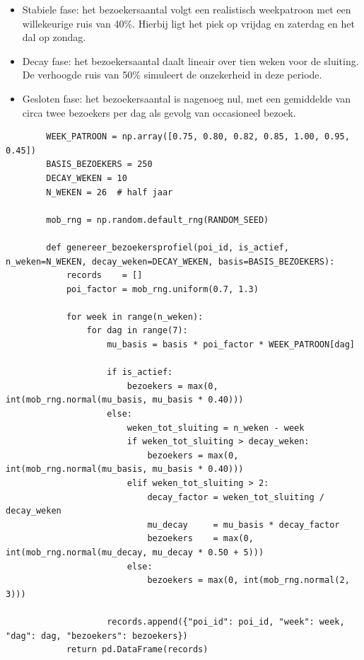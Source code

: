 \begin{itemize}
    \item Stabiele fase: het bezoekersaantal volgt een realistisch weekpatroon met een willekeurige ruis van 40\%. Hierbij ligt het piek op vrijdag en zaterdag en het dal op zondag.
    \item Decay fase: het bezoekersaantal daalt lineair over tien weken voor de sluiting. De verhoogde ruis van 50\% simuleert de onzekerheid in deze periode.
    \item Gesloten fase: het bezoekersaantal is nagenoeg nul, met een gemiddelde van circa twee bezoekers per dag als gevolg van occasioneel bezoek.
\end{itemize}

\begin{listing}[H]
    \begin{verbatim}
        WEEK_PATROON = np.array([0.75, 0.80, 0.82, 0.85, 1.00, 0.95, 0.45])
        BASIS_BEZOEKERS = 250
        DECAY_WEKEN = 10
        N_WEKEN = 26  # half jaar
        
        mob_rng = np.random.default_rng(RANDOM_SEED)
        
        def genereer_bezoekersprofiel(poi_id, is_actief, n_weken=N_WEKEN, decay_weken=DECAY_WEKEN, basis=BASIS_BEZOEKERS):
            records    = []
            poi_factor = mob_rng.uniform(0.7, 1.3)
            
            for week in range(n_weken):
                for dag in range(7):
                    mu_basis = basis * poi_factor * WEEK_PATROON[dag]
            
                    if is_actief:
                        bezoekers = max(0, int(mob_rng.normal(mu_basis, mu_basis * 0.40)))
                    else:
                        weken_tot_sluiting = n_weken - week
                        if weken_tot_sluiting > decay_weken:
                            bezoekers = max(0, int(mob_rng.normal(mu_basis, mu_basis * 0.40)))
                        elif weken_tot_sluiting > 2:
                            decay_factor = weken_tot_sluiting / decay_weken
                            mu_decay     = mu_basis * decay_factor
                            bezoekers    = max(0, int(mob_rng.normal(mu_decay, mu_decay * 0.50 + 5)))
                        else:
                            bezoekers = max(0, int(mob_rng.normal(2, 3)))
            
                    records.append({"poi_id": poi_id, "week": week, "dag": dag, "bezoekers": bezoekers})
            return pd.DataFrame(records)
    \end{verbatim}
    \caption[Generatiefunctie kunstmatige mobiliteitsdata]{Parameters en functie voor het simuleren van dagelijkse bezoekersaantallen per POI over 26 weken.}
\end{listing}

